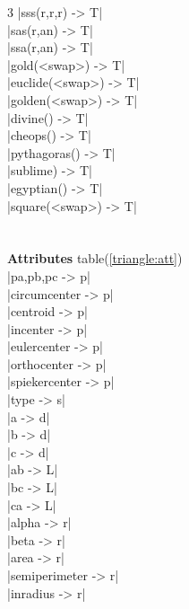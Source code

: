\documentclass[DIV         = 14,
               fontsize    = 10,
               index       = totoc,
               twoside,
               cadre,
               headings    = small
               ]{tkz-doc}
\begin{document}
\begin{multicols}{3}
|sss(r,r,r)                -> T|   \\
|sas(r,an)                 -> T|   \\
|ssa(r,an)                 -> T|   \\
|gold(<swap>)              -> T|   \\
|euclide(<swap>)           -> T|   \\
|golden(<swap>)            -> T|   \\
|divine()                  -> T|   \\
|cheops()                  -> T|   \\
|pythagoras()              -> T|   \\
|sublime)                  -> T|   \\
|egyptian()                -> T|   \\
|square(<swap>)            -> T|   \\
                                   \\
           \\
\textbf{Attributes} table(\ref{triangle:att})  \\
|pa,pb,pc                  -> p|  \\
|circumcenter              -> p|  \\
|centroid                  -> p|  \\
|incenter                  -> p|  \\
|eulercenter               -> p|  \\
|orthocenter               -> p|  \\
|spiekercenter             -> p|  \\
|type                      -> s|  \\
|a                         -> d|  \\
|b                         -> d|  \\
|c                         -> d|  \\
|ab                        -> L|  \\
|bc                        -> L|  \\
|ca                        -> L|  \\
|alpha                     -> r|  \\
|beta                      -> r|  \\
|area                      -> r|  \\
|semiperimeter             -> r|  \\
|inradius                  -> r|  \\

\end{multicols}
\end{document}
